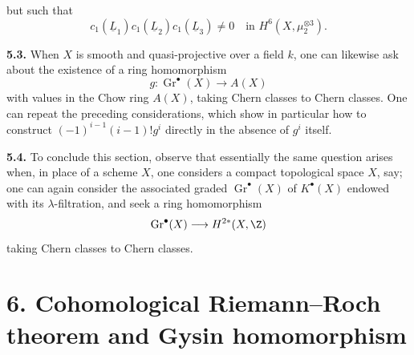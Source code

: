 %
but such that
\[
 c_1(\underline{L}_1)c_1(\underline{L}_2)c_1(\underline{L}_3)\ne0
 \quad\text{in }H^6(X,\mu_2^{\otimes3}).
\]

\textbf{5.3.} When $X$ is smooth and quasi-projective over a field $k$, one can likewise ask about the existence of a ring homomorphism
\[
 g:\operatorname{Gr}^\bullet(X)\longrightarrow A(X)
\]
with values in the Chow ring $A(X)$, taking Chern classes to Chern classes. One can repeat the preceding considerations, which show in particular how to construct $(-1)^{i-1}(i-1)!g^i$ directly in the absence of $g^i$ itself.

\textbf{5.4.} To conclude this section, observe that essentially the same question arises when, in place of a scheme $X$, one considers a compact topological space $X$, say; one can again consider the associated graded $\operatorname{Gr}^\bullet(X)$ of $K^\bullet(X)$ endowed with its $\lambda$-filtration, and seek a ring homomorphism
\[
 \operatorname{Gr}^\bullet(X)\longrightarrow H^{2*}(X,\Z)
\]
taking Chern classes to Chern classes.

\section*{6. Cohomological Riemann--Roch theorem and Gysin homomorphism}

